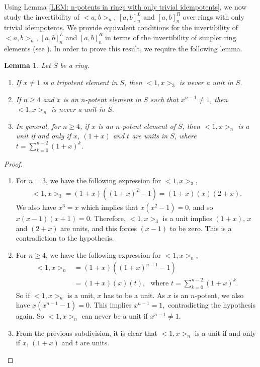 \documentclass[12pt]{amsart}
\newtheorem{lem}[theorem]{Lemma}
\theoremstyle{definition}
\numberwithin{equation}{section}
\begin{document}
Using Lemma \ref{LEM: n-potents in rings with only trivial idempotents}, we now study the invertibility of 
$<a,b>_n$, $[a,b]_n^L$ and $[a,b]_n^R$ over rings with only trivial idempotents. We provide equivalent conditions for the invertibility of 
$<a,b>_n$, $[a,b]_n^L$ and $[a,b]_n^R$ in terms of the invertibility of simpler ring elements (see ). In order to prove this result, we require the following lemma. 
\begin{lem}\label{LEM: Commutators and Anticommutators that include Unity}
    Let $S$ be a ring. 
\begin{enumerate}
    \item If $x \neq 1$ is a tripotent element in $S$, then $<1,x>_3$ is never a unit in $S$. 
    \item If $n\ge 4$ and $x$ is an $n$-potent element in $S$ such that $x^{n-1} \neq 1$, then $<1,x>_n$ is never a unit in $S$.
    \item In general, for $n \ge 4$, if $x$ is an $n$-potent element of $S$, then $<1,x>_n$ is a unit if and only if $x$, $(1+x)$ and $t$ are units in $S$, where $t = \sum\limits_{k=0}^{n-2}(1+x)^{k}$.
\end{enumerate}
\end{lem}
\begin{proof}
    \begin{enumerate}
        \item For $n=3$, we have the following expression for $<1,x>_3$,
        \begin{align*}
           <1,x>_3  = (1+x)((1+x)^2-1) = (1+x)(x)(2+x).
        \end{align*}
         We also have $x^3 = x$ which implies that
            $x(x^2-1) = 0$, and so $x(x-1)(x+1) = 0.$ Therefore, $<1,x>_3$ is a unit implies $(1+x)$, $x$ and $(2+x)$ are units, and this forces $(x-1)$ to be zero. This is a contradiction to the hypothesis. 
             \item For $n \geq 4$,  we have the following expression for $<1,x>_n$,
             \begin{align*}
              <1,x>_n & = (1+x)((1+x)^{n-1}-1)   \\
              & = (1+x)(x)(t),~~~\text{where $t = \sum\limits_{k=0}^{n-2}(1+x)^k$.}
             \end{align*}
             So if $<1,x>_n$ is a unit, $x$ has to be a unit. As $x$ is an $n$-potent, we also have $x(x^{n-1}-1)=0$. This implies $x^{n-1} = 1,$ contradicting the hypothesis again. So $<1,x>_n$ can never be a unit if $x^{n-1} \neq 1.$
             \item From the previous subdivision, it is clear that $<1,x>_n$ is a unit if and only if $x$, $(1+x)$ and $t$ are units.
    \end{enumerate}
\end{proof}
\end{document}
